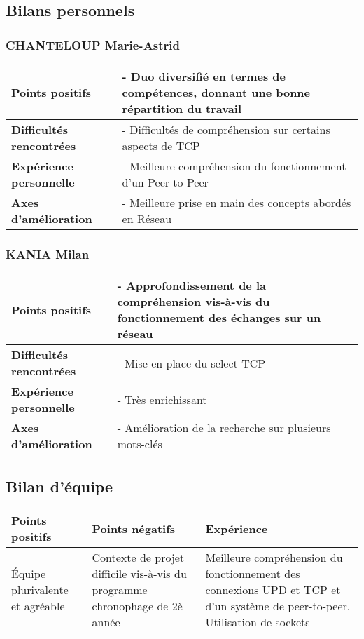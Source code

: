 \subsection{Bilans personnels}
\subsubsection{CHANTELOUP Marie-Astrid}
\begin{tabularx}{\textwidth}{|p{4.1cm}|X|}
    \hline
    \textbf{Points positifs} &  - Duo diversifié en termes de compétences, donnant une bonne répartition du travail\\
    \hline
    \textbf{Difficultés rencontrées} & - Difficultés de compréhension sur certains aspects de TCP\\
    \hline
    \textbf{Expérience personnelle} &  - Meilleure compréhension du fonctionnement d'un Peer to Peer \\%
    \hline
    \textbf{Axes d'amélioration} & - Meilleure prise en main des concepts abordés en Réseau\\
    \hline
\end{tabularx}

\subsubsection{KANIA Milan}
\begin{tabularx}{\textwidth}{|p{4.1cm}|X|}
    \hline
    \textbf{Points positifs} &  - Approfondissement de la compréhension vis-à-vis du fonctionnement des échanges sur un réseau\\
    \hline
    \textbf{Difficultés rencontrées} & - Mise en place du select TCP\\
    \hline
    \textbf{Expérience personnelle} &  - Très enrichissant\\
    \hline
    \textbf{Axes d'amélioration} & - Amélioration de la recherche sur plusieurs mots-clés\\
    \hline
\end{tabularx}

\subsection{Bilan d'équipe}

    \begin{tabularx}{\textwidth}{|X|X|X|}
    \hline
    Points positifs & Points négatifs & Expérience\\
    \hline
    Équipe plurivalente et agréable & Contexte de projet difficile vis-à-vis du programme chronophage de 2è année & Meilleure compréhension du fonctionnement des connexions UPD et TCP et d'un système de peer-to-peer. Utilisation de sockets\\
    \hline
    \end{tabularx}